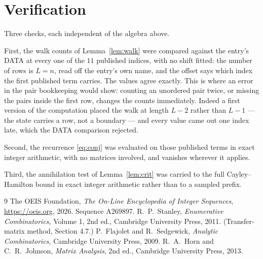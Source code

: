 \documentclass[11pt,a4paper]{article}
\theoremstyle{plain}
\theoremstyle{definition}
\begin{document}
\section{Verification}

Three checks, each independent of the algebra above.

First, the walk counts of Lemma~\ref{lem:walk} were compared against the entry's DATA at
every one of the $11$ published indices, with no shift fitted: the number of rows is
$L=n$, read off the entry's own name, and the offset says which index the first
published term carries. The values agree exactly. This is where an error in the pair
bookkeeping would show: counting an unordered pair twice, or missing the pairs inside the
first row, changes the counts immediately. Indeed a first version of the computation
placed the walk at length $L-2$ rather than $L-1$ --- the state carries a row, not a
boundary --- and every value came out one index late, which the DATA comparison rejected.

Second, the recurrence \eqref{eq:conj} was evaluated on those published terms in exact
integer arithmetic, with no matrices involved, and vanishes wherever it applies.

Third, the annihilation test of Lemma~\ref{lem:crit} was carried to the full
Cayley--Hamilton bound in exact integer arithmetic rather than to a sampled prefix.

\begin{thebibliography}{9}
 The OEIS Foundation, \emph{The On-Line Encyclopedia of Integer
Sequences}, \url{https://oeis.org}, 2026. Sequence A269897.
 R.~P.~Stanley, \emph{Enumerative Combinatorics}, Volume 1, 2nd ed.,
Cambridge University Press, 2011. (Transfer-matrix method, Section 4.7.)
 P.~Flajolet and R.~Sedgewick, \emph{Analytic Combinatorics}, Cambridge
University Press, 2009.
 R.~A.~Horn and C.~R.~Johnson, \emph{Matrix Analysis}, 2nd ed., Cambridge
University Press, 2013.
\end{thebibliography}
\end{document}
